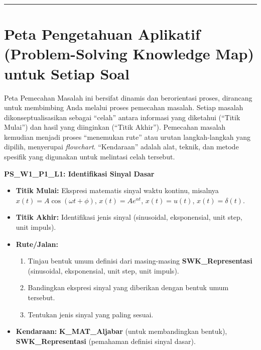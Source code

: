 \documentclass[
  letterpaper,
  DIV=11,
  numbers=noendperiod]{scrreprt}
\providecommand{\tightlist}{%
  \setlength{\itemsep}{0pt}\setlength{\parskip}{0pt}}
\begin{document}
\begin{center}\rule{0.5\linewidth}{0.5pt}\end{center}

\section{Peta Pengetahuan Aplikatif (Problem-Solving Knowledge Map)
untuk Setiap
Soal}\label{peta-pengetahuan-aplikatif-problem-solving-knowledge-map-untuk-setiap-soal}

Peta Pemecahan Masalah ini bersifat dinamis dan berorientasi proses,
dirancang untuk membimbing Anda melalui proses pemecahan masalah. Setiap
masalah dikonseptualisasikan sebagai ``celah'' antara informasi yang
diketahui (``Titik Mulai'') dan hasil yang diinginkan (``Titik Akhir'').
Pemecahan masalah kemudian menjadi proses ``menemukan rute'' atau urutan
langkah-langkah yang dipilih, menyerupai \emph{flowchart}. ``Kendaraan''
adalah alat, teknik, dan metode spesifik yang digunakan untuk melintasi
celah tersebut.

\textbf{PS\_W1\_P1\_L1: Identifikasi Sinyal Dasar}

\begin{itemize}
\tightlist
\item
  \textbf{Titik Mulai:} Ekspresi matematis sinyal waktu kontinu,
  misalnya \(x(t) = A \cos(\omega t + \phi)\),
  \(x(t) = A e^{\alpha t}\), \(x(t) = u(t)\), \(x(t) = \delta(t)\).
\item
  \textbf{Titik Akhir:} Identifikasi jenis sinyal (sinusoidal,
  eksponensial, unit step, unit impuls).
\item
  \textbf{Rute/Jalan:}

  \begin{enumerate}
  \def\labelenumi{\arabic{enumi}.}
  \tightlist
  \item
    Tinjau bentuk umum definisi dari masing-masing
    \textbf{SWK\_Representasi} (sinusoidal, eksponensial, unit step,
    unit impuls).
  \item
    Bandingkan ekspresi sinyal yang diberikan dengan bentuk umum
    tersebut.
  \item
    Tentukan jenis sinyal yang paling sesuai.
  \end{enumerate}
\item
  \textbf{Kendaraan:} \textbf{K\_MAT\_Aljabar} (untuk membandingkan
  bentuk), \textbf{SWK\_Representasi} (pemahaman definisi sinyal dasar).
\end{itemize}
\end{document}
